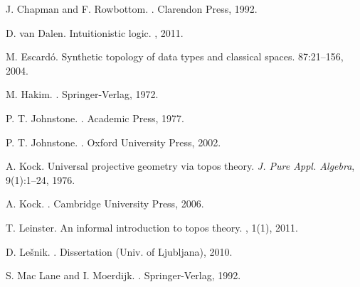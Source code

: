 \documentclass[10pt,utf8,notheorems,compress]{beamer}
\newcommand{\?}{\,{:}\,}
\renewcommand{\_}{\mathpunct{.}\,}
\begin{document}
{\begin{thebibliography}{1800}
      J. Chapman and F. Rowbottom.
      .
      \newblock Clarendon Press, 1992.

      D. van Dalen.
      \newblock Intuitionistic logic.
      , 2011.

      M. Escardó.
      \newblock Synthetic topology of data types and classical spaces.
       87:21--156, 2004.

      M. Hakim.
      .
      \newblock Springer-Verlag, 1972.

      P. T. Johnstone.
      .
      \newblock Academic Press, 1977.

      P. T. Johnstone.
      .
      \newblock Oxford University Press, 2002.

      A. Kock.
      \newblock Universal projective geometry via topos theory.
      \newblock \emph{J. Pure Appl. Algebra}, 9(1):1--24, 1976.

      A. Kock.
      .
      \newblock Cambridge University Press, 2006.

      T. Leinster.
      \newblock An informal introduction to topos theory.
      , 1(1), 2011.

      D. Lešnik.
      .
      \newblock Dissertation (Univ. of Ljubljana), 2010.

      S. Mac Lane and I. Moerdijk.
      .
      \newblock Springer-Verlag, 1992.


\end{thebibliography}}
\end{document}
